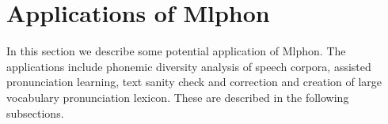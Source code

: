 \section{Applications of Mlphon}
\label{applications}
In this section we describe some potential application of Mlphon. The applications include  phonemic diversity analysis of speech corpora, assisted pronunciation learning, text sanity check and correction and creation of large vocabulary pronunciation lexicon. These are described in the following subsections.




